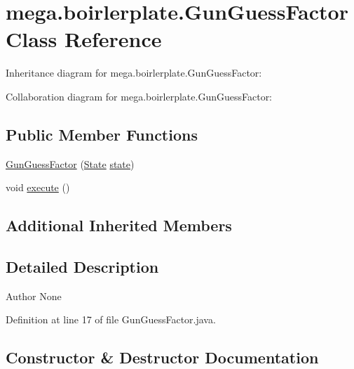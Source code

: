 \hypertarget{classmega_1_1boirlerplate_1_1_gun_guess_factor}{}\section{mega.\+boirlerplate.\+Gun\+Guess\+Factor Class Reference}
\label{classmega_1_1boirlerplate_1_1_gun_guess_factor}


Inheritance diagram for mega.\+boirlerplate.\+Gun\+Guess\+Factor\+:


Collaboration diagram for mega.\+boirlerplate.\+Gun\+Guess\+Factor\+:
\subsection*{Public Member Functions}
\begin{DoxyCompactItemize}
\item 
\hyperlink{classmega_1_1boirlerplate_1_1_gun_guess_factor_a9c9963d33f6ca2de9543ad39ca2106c9}{Gun\+Guess\+Factor} (\hyperlink{classmega_1_1boirlerplate_1_1_state}{State} \hyperlink{classmega_1_1boirlerplate_1_1_component_a87b0d70f323b5fee60a200e07c9c20fd}{state})
\item 
void \hyperlink{classmega_1_1boirlerplate_1_1_gun_guess_factor_ad85d1e803b5e48e4dd442bd2f00c4323}{execute} ()
\end{DoxyCompactItemize}
\subsection*{Additional Inherited Members}


\subsection{Detailed Description}
\begin{DoxyAuthor}{Author}
None 
\end{DoxyAuthor}


Definition at line 17 of file Gun\+Guess\+Factor.\+java.



\subsection{Constructor \& Destructor Documentation}
\mbox{\label{classmega_1_1boirlerplate_1_1_gun_guess_factor_a9c9963d33f6ca2de9543ad39ca2106c9}} 
